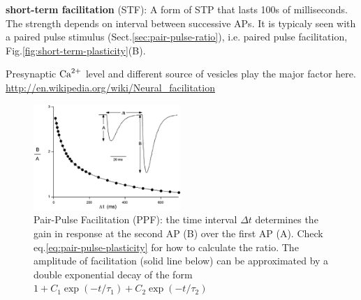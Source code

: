 {\bf short-term facilitation} (STF):  A form of STP that lasts 100s of
milliseconds. The strength depends on interval between successive APs. It is
typicaly seen with a paired pulse stimulus (Sect.\ref{sec:pair-pulse-ratio}),
i.e. paired pulse facilitation, Fig.\ref{fig:short-term-plasticity}(B).

Presynaptic ${\text{Ca}^{2+}}$ level and different source of vesicles play the major factor
here. \url{http://en.wikipedia.org/wiki/Neural_facilitation}
  
\begin{figure}[hbtp]
  \centerline{\includegraphics[height=4cm,
    angle=0]{./images/PairPulseFacilitation.eps}}
\caption{Pair-Pulse Facilitation (PPF): the time interval $\Delta t$ determines
the gain in response at the second AP (B) over the first AP (A).
Check eq.\ref{eq:pair-pulse-plasticity} for how to calculate the ratio.
The amplitude of facilitation (solid line below) can be approximated by a double
exponential decay of the form $1 + C_1 \exp(-t/\tau_1) + C_2 \exp(-t/\tau_2)$}
\label{fig:PairPulseFacilitation}
\end{figure}

